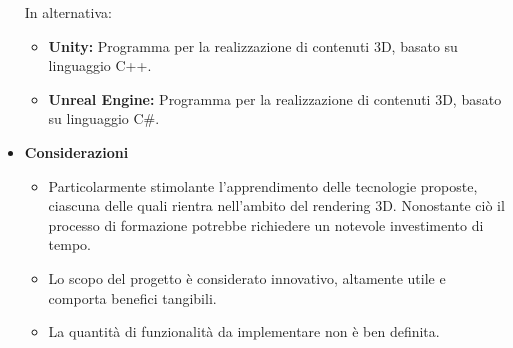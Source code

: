 \documentclass{article}
\begin{document}
\begin{itemize}
    In alternativa:

    \begin{itemize}
        \item \textbf{Unity:} Programma per la realizzazione di contenuti 3D, basato su linguaggio C++.
        \item \textbf{Unreal Engine:} Programma per la realizzazione di contenuti 3D, basato su linguaggio C\#.
    \end{itemize}
        
    \item[] \textbf{Considerazioni}
    \begin{itemize}
        \item Particolarmente stimolante l'apprendimento delle tecnologie proposte, ciascuna delle quali rientra nell'ambito del rendering 3D. Nonostante ciò il processo di formazione potrebbe richiedere un notevole investimento di tempo.
        \item Lo scopo del progetto è considerato innovativo, altamente utile e comporta benefici tangibili.
        \item La quantità di funzionalità da implementare non è ben definita.
    \end{itemize} 

\end{itemize}
\pagebreak

\end{document}
